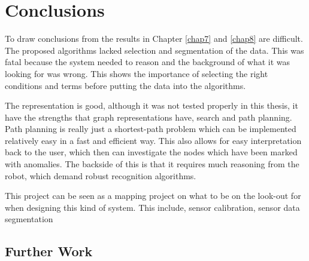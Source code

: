 
\chapter{Conclusions}
\label{chap9}
To draw conclusions from the results in Chapter \ref{chap7} and \ref{chap8} are difficult.
The proposed algorithms lacked selection and segmentation of the data. This was fatal
because the system needed to reason and the background of what it was looking for was
wrong. This shows the importance of selecting the right conditions and terms before
putting the data into the algorithms.

The representation is good, although it was not tested properly in this thesis, it have
the strengths that graph representations have, search and path planning. Path planning is
really just a shortest-path problem which can be implemented relatively easy in a fast and
efficient way. This also allows for easy interpretation back to the user, which then can
investigate the nodes which have been marked with anomalies. The backside of this is that
it requires much reasoning from the robot, which demand robust recognition algorithms.


This project can be seen as a mapping project on what to be on the look-out for when
designing this kind of system. This include, sensor calibration, sensor data
segmentation



\section{Further Work}


